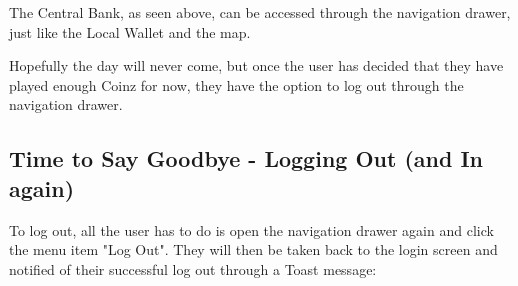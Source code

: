 \documentclass[11pt,a4paper,notitlepage]{article}
\begin{document}
    The Central Bank, as seen above, can be accessed through the navigation drawer, just like the Local Wallet and the map.

    Hopefully the day will never come, but once the user has decided that they have played enough Coinz for now, they have the option to log out through the navigation drawer.

\subsection{Time to Say Goodbye - Logging Out (and In again)}

    To log out, all the user has to do is open the navigation drawer again and click the menu item "Log Out". They will then be taken back to the login screen and notified of their successful log out through a Toast message:
\end{document}
